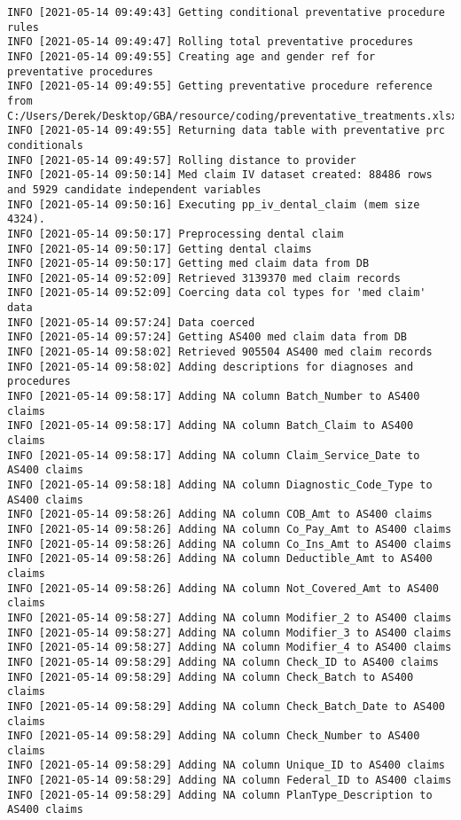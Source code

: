 \documentclass[
]{book}
\begin{document}
\begin{verbatim}
INFO [2021-05-14 09:49:43] Getting conditional preventative procedure rules
INFO [2021-05-14 09:49:47] Rolling total preventative procedures
INFO [2021-05-14 09:49:55] Creating age and gender ref for preventative procedures
INFO [2021-05-14 09:49:55] Getting preventative procedure reference from C:/Users/Derek/Desktop/GBA/resource/coding/preventative_treatments.xlsx
INFO [2021-05-14 09:49:55] Returning data table with preventative prc conditionals
INFO [2021-05-14 09:49:57] Rolling distance to provider
INFO [2021-05-14 09:50:14] Med claim IV dataset created: 88486 rows and 5929 candidate independent variables
INFO [2021-05-14 09:50:16] Executing pp_iv_dental_claim (mem size 4324).
INFO [2021-05-14 09:50:17] Preprocessing dental claim
INFO [2021-05-14 09:50:17] Getting dental claims
INFO [2021-05-14 09:50:17] Getting med claim data from DB
INFO [2021-05-14 09:52:09] Retrieved 3139370 med claim records
INFO [2021-05-14 09:52:09] Coercing data col types for 'med claim' data
INFO [2021-05-14 09:57:24] Data coerced
INFO [2021-05-14 09:57:24] Getting AS400 med claim data from DB
INFO [2021-05-14 09:58:02] Retrieved 905504 AS400 med claim records
INFO [2021-05-14 09:58:02] Adding descriptions for diagnoses and procedures
INFO [2021-05-14 09:58:17] Adding NA column Batch_Number to AS400 claims
INFO [2021-05-14 09:58:17] Adding NA column Batch_Claim to AS400 claims
INFO [2021-05-14 09:58:17] Adding NA column Claim_Service_Date to AS400 claims
INFO [2021-05-14 09:58:18] Adding NA column Diagnostic_Code_Type to AS400 claims
INFO [2021-05-14 09:58:26] Adding NA column COB_Amt to AS400 claims
INFO [2021-05-14 09:58:26] Adding NA column Co_Pay_Amt to AS400 claims
INFO [2021-05-14 09:58:26] Adding NA column Co_Ins_Amt to AS400 claims
INFO [2021-05-14 09:58:26] Adding NA column Deductible_Amt to AS400 claims
INFO [2021-05-14 09:58:26] Adding NA column Not_Covered_Amt to AS400 claims
INFO [2021-05-14 09:58:27] Adding NA column Modifier_2 to AS400 claims
INFO [2021-05-14 09:58:27] Adding NA column Modifier_3 to AS400 claims
INFO [2021-05-14 09:58:27] Adding NA column Modifier_4 to AS400 claims
INFO [2021-05-14 09:58:29] Adding NA column Check_ID to AS400 claims
INFO [2021-05-14 09:58:29] Adding NA column Check_Batch to AS400 claims
INFO [2021-05-14 09:58:29] Adding NA column Check_Batch_Date to AS400 claims
INFO [2021-05-14 09:58:29] Adding NA column Check_Number to AS400 claims
INFO [2021-05-14 09:58:29] Adding NA column Unique_ID to AS400 claims
INFO [2021-05-14 09:58:29] Adding NA column Federal_ID to AS400 claims
INFO [2021-05-14 09:58:29] Adding NA column PlanType_Description to AS400 claims

\end{verbatim}
\end{document}
